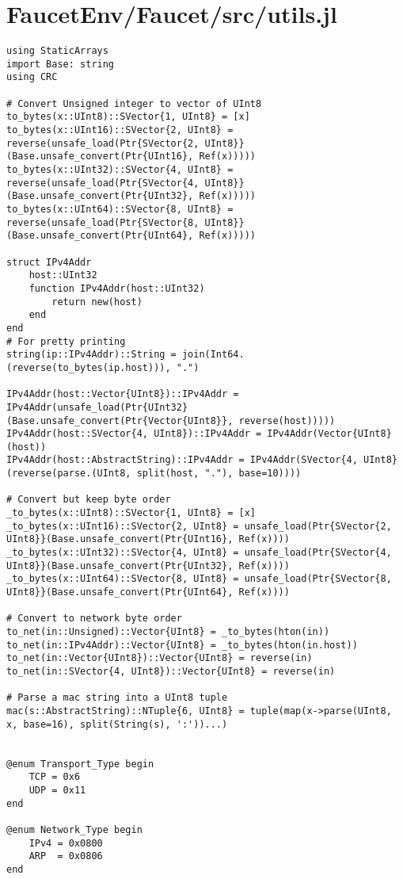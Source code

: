\section{FaucetEnv/Faucet/src/utils.jl}
\begin{lstlisting}[language=JuliaLocal, style=julia]
using StaticArrays
import Base: string
using CRC

# Convert Unsigned integer to vector of UInt8
to_bytes(x::UInt8)::SVector{1, UInt8} = [x]
to_bytes(x::UInt16)::SVector{2, UInt8} = reverse(unsafe_load(Ptr{SVector{2, UInt8}}(Base.unsafe_convert(Ptr{UInt16}, Ref(x)))))
to_bytes(x::UInt32)::SVector{4, UInt8} = reverse(unsafe_load(Ptr{SVector{4, UInt8}}(Base.unsafe_convert(Ptr{UInt32}, Ref(x)))))
to_bytes(x::UInt64)::SVector{8, UInt8} = reverse(unsafe_load(Ptr{SVector{8, UInt8}}(Base.unsafe_convert(Ptr{UInt64}, Ref(x)))))

struct IPv4Addr
    host::UInt32
    function IPv4Addr(host::UInt32)
        return new(host)
    end
end
# For pretty printing
string(ip::IPv4Addr)::String = join(Int64.(reverse(to_bytes(ip.host))), ".")

IPv4Addr(host::Vector{UInt8})::IPv4Addr = IPv4Addr(unsafe_load(Ptr{UInt32}(Base.unsafe_convert(Ptr{Vector{UInt8}}, reverse(host)))))
IPv4Addr(host::SVector{4, UInt8})::IPv4Addr = IPv4Addr(Vector{UInt8}(host))
IPv4Addr(host::AbstractString)::IPv4Addr = IPv4Addr(SVector{4, UInt8}(reverse(parse.(UInt8, split(host, "."), base=10))))

# Convert but keep byte order
_to_bytes(x::UInt8)::SVector{1, UInt8} = [x]
_to_bytes(x::UInt16)::SVector{2, UInt8} = unsafe_load(Ptr{SVector{2, UInt8}}(Base.unsafe_convert(Ptr{UInt16}, Ref(x))))
_to_bytes(x::UInt32)::SVector{4, UInt8} = unsafe_load(Ptr{SVector{4, UInt8}}(Base.unsafe_convert(Ptr{UInt32}, Ref(x))))
_to_bytes(x::UInt64)::SVector{8, UInt8} = unsafe_load(Ptr{SVector{8, UInt8}}(Base.unsafe_convert(Ptr{UInt64}, Ref(x))))

# Convert to network byte order
to_net(in::Unsigned)::Vector{UInt8} = _to_bytes(hton(in))
to_net(in::IPv4Addr)::Vector{UInt8} = _to_bytes(hton(in.host))
to_net(in::Vector{UInt8})::Vector{UInt8} = reverse(in)
to_net(in::SVector{4, UInt8})::Vector{UInt8} = reverse(in)

# Parse a mac string into a UInt8 tuple
mac(s::AbstractString)::NTuple{6, UInt8} = tuple(map(x->parse(UInt8, x, base=16), split(String(s), ':'))...)


@enum Transport_Type begin
    TCP = 0x6
    UDP = 0x11
end

@enum Network_Type begin
    IPv4 = 0x0800
    ARP  = 0x0806
end


\end{lstlisting}
